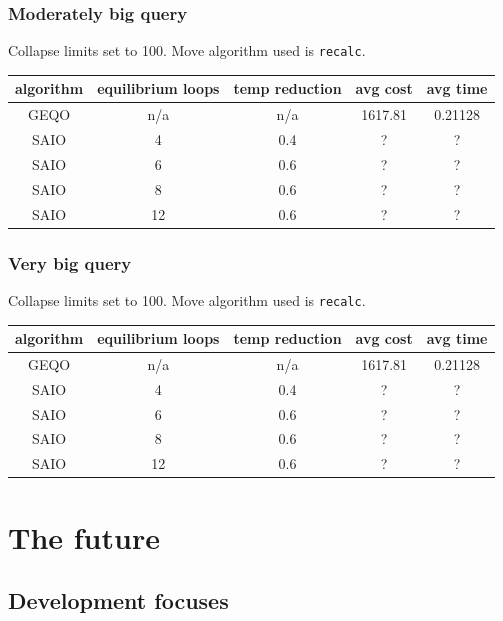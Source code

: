 \documentclass{beamer}
\begin{document}
\begin{frame}
  \frametitle{Moderately big query}

  Collapse limits set to 100. Move algorithm used is \texttt{recalc}.

  \begin{center}
    \begin{tabular}{ccccc}
      algorithm & equilibrium loops & temp reduction & avg cost & avg time
      \\ \hline \hline
      GEQO & n/a & n/a & 1617.81 & 0.21128 \\ \hline
      SAIO & 4   & 0.4 & ? & ? \\ \hline
      SAIO & 6   & 0.6 & ? & ? \\ \hline
      SAIO & 8   & 0.6 & ? & ? \\ \hline
      SAIO & 12  & 0.6 & ? & ? \\ \hline
    \end{tabular}
  \end{center}

\end{frame}

\begin{frame}
  \frametitle{Very big query}

  Collapse limits set to 100. Move algorithm used is \texttt{recalc}.

  \begin{center}
    \begin{tabular}{ccccc}
      algorithm & equilibrium loops & temp reduction & avg cost & avg time
      \\ \hline \hline
      GEQO & n/a & n/a & 1617.81 & 0.21128 \\ \hline
      SAIO & 4   & 0.4 & ? & ? \\ \hline
      SAIO & 6   & 0.6 & ? & ? \\ \hline
      SAIO & 8   & 0.6 & ? & ? \\ \hline
      SAIO & 12  & 0.6 & ? & ? \\ \hline
    \end{tabular}
  \end{center}

\end{frame}

\section{The future}
\subsection{Development focuses}
\end{document}
